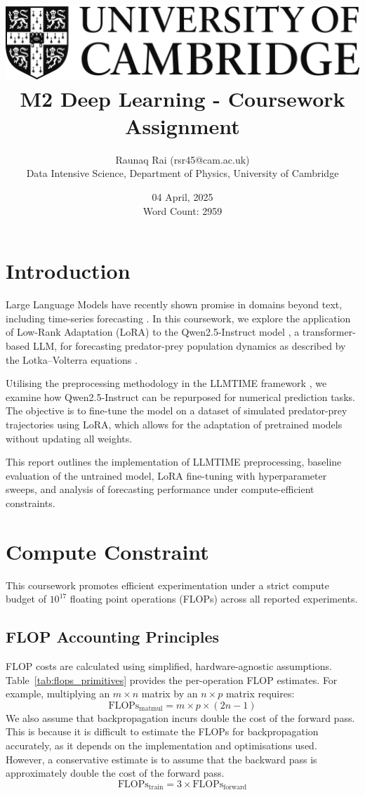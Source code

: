 \documentclass[a4paper,12pt]{article}
\title{
    \includegraphics[scale=0.4]{Cam_logo_bw.png}\\
    \vspace{0.5cm}
    M2 Deep Learning - Coursework Assignment
}
\author{Raunaq Rai (rsr45@cam.ac.uk)\\
    Data Intensive Science, Department of Physics, University of Cambridge
}
\date{04 April, 2025 \\ \vspace{0.2cm} {\small Word Count: 2959}}
\begin{document}
\maketitle

\section*{Introduction}

Large Language Models have recently shown promise in domains beyond text, including time-series forecasting \citep{gruver2023language}. In this coursework, we explore the application of Low-Rank Adaptation (LoRA) \citep{hu2021lora} to the Qwen2.5-Instruct model \citep{qwen2.5}, a transformer-based LLM, for forecasting predator-prey population dynamics as described by the Lotka–Volterra equations \citep{takeuchi2006lotka}.

Utilising the preprocessing methodology in the LLMTIME framework \citep{gruver2023language}, we examine how Qwen2.5-Instruct can be repurposed for numerical prediction tasks. The objective is to fine-tune the model on a dataset of simulated predator-prey trajectories using LoRA, which allows for the adaptation of pretrained models without updating all weights.

This report outlines the implementation of LLMTIME preprocessing, baseline evaluation of the untrained model, LoRA fine-tuning with hyperparameter sweeps, and analysis of forecasting performance under compute-efficient constraints.

\section{Compute Constraint}

This coursework promotes efficient experimentation under a strict compute budget of $10^{17}$ floating point operations (FLOPs) across all reported experiments.

\subsection*{FLOP Accounting Principles}

FLOP costs are calculated using simplified, hardware-agnostic assumptions. Table~\ref{tab:flops_primitives} provides the per-operation FLOP estimates. For example, multiplying an $m \times n$ matrix by an $n \times p$ matrix requires:
\begin{equation}
\text{FLOPs}_{\text{matmul}} = m \times p \times (2n - 1)
\end{equation}
We also assume that backpropagation incurs double the cost of the forward pass. This is because it is difficult to estimate the FLOPs for backpropagation accurately, as it depends on the implementation and optimisations used. However, a conservative estimate is to assume that the backward pass is approximately double the cost of the forward pass.
\begin{equation}
\text{FLOPs}_{\text{train}} = 3 \times \text{FLOPs}_{\text{forward}}
\end{equation}
\end{document}
